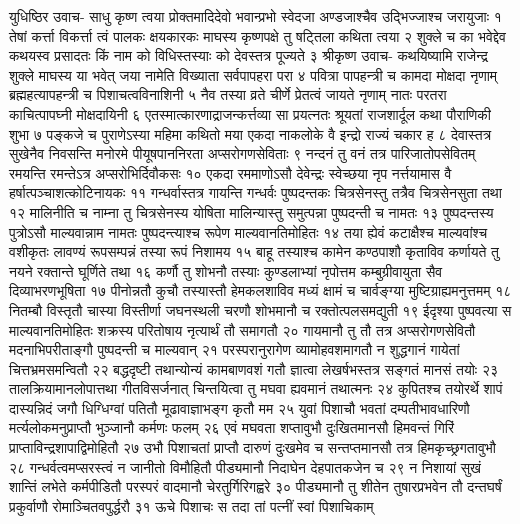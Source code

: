 युधिष्ठिर उवाच-
साधु कृष्ण त्वया प्रोक्तमादिदेवो भवान्प्रभो 
स्वेदजा अण्डजाश्चैव उद्भिज्जाश्च जरायुजाः १
तेषां कर्त्ता विकर्त्ता त्वं पालकः क्षयकारकः 
माघस्य कृष्णपक्षे तु षट्तिला कथिता त्वया २
शुक्ले च का भवेद्देव कथयस्व प्रसादतः 
किं नाम को विधिस्तस्याः को देवस्तत्र पूज्यते ३
श्रीकृष्ण उवाच-
कथयिष्यामि राजेन्द्र शुक्ले माघस्य या भवेत् 
जया नामेति विख्याता सर्वपापहरा परा ४
पवित्रा पापहन्त्री च कामदा मोक्षदा नृणाम् 
ब्रह्महत्यापहन्त्री च पिशाचत्वविनाशिनी ५
नैव तस्या व्रते चीर्णे प्रेतत्वं जायते नृणाम् 
नातः परतरा काचित्पापघ्नी मोक्षदायिनी ६
एतस्मात्कारणाद्राजन्कर्त्तव्या सा प्रयत्नतः 
श्रूयतां राजशार्दूल कथा पौराणिकी शुभा ७
पङ्कजे च पुराणेऽस्या महिमा कथितो मया 
एकदा नाकलोके वै इन्द्रो राज्यं चकार ह ८
देवास्तत्र सुखेनैव निवसन्ति मनोरमे 
पीयूषपाननिरता अप्सरोगणसेविताः ९
नन्दनं तु वनं तत्र पारिजातोपसेवितम् 
रमयन्ति रमन्तेऽत्र अप्सरोभिर्दिवौकसः १०
एकदा रममाणोऽसौ देवेन्द्रः स्वेच्छया नृप 
नर्त्तयामास वै हर्षात्पञ्चाशत्कोटिनायकः ११
गन्धर्वास्तत्र गायन्ति गन्धर्वः पुष्पदन्तकः 
चित्रसेनस्तु तत्रैव चित्रसेनसुता तथा १२
मालिनीति च नाम्ना तु चित्रसेनस्य योषिता 
मालिन्यास्तु समुत्पन्ना पुष्पदन्ती च नामतः १३
पुष्पदन्तस्य पुत्रोऽसौ माल्यवान्नाम नामतः 
पुष्पदन्त्याश्च रूपेण माल्यवानतिमोहितः १४
तया ह्येवं कटाक्षैश्च माल्यवांश्च वशीकृतः 
लावण्यं रूपसम्पन्नं तस्या रूपं निशामय १५
बाहू तस्याश्च कामेन कण्ठपाशौ कृताविव 
कर्णायते तु नयने रक्तान्ते घूर्णिते तथा १६
कर्णौ तु शोभनौ तस्याः कुण्डलाभ्यां नृपोत्तम 
कम्बुग्रीवायुता सैव दिव्याभरणभूषिता १७
पीनोन्नतौ कुचौ तस्यास्तौ हेमकलशाविव 
मध्यं क्षामं च चार्वङ्ग्या मुष्टिग्राह्यमनुत्तमम् १८
नितम्बौ विस्तृतौ चास्या विस्तीर्णा जघनस्थली 
चरणौ शोभमानौ च रक्तोत्पलसमद्युती १९
ईदृश्या पुष्पवत्या स माल्यवानतिमोहितः 
शक्रस्य परितोषाय नृत्यार्थं तौ समागतौ २०
गायमानौ तु तौ तत्र अप्सरोगणसेवितौ 
मदनाभिपरीताङ्गौ पुष्पदन्ती च माल्यवान् २१
परस्परानुरागेण व्यामोहवशमागतौ 
न शुद्धगानं गायेतां चित्तभ्रमसमन्वितौ २२
बद्धदृष्टी तथान्योन्यं कामबाणवशं गतौ 
ज्ञात्वा लेखर्षभस्तत्र सङ्गतं मानसं तयोः २३
तालक्रियामानलोपात्तथा गीतविसर्जनात् 
चिन्तयित्वा तु मघवा ह्यवमानं तथात्मनः २४
कुपितश्च तयोरर्थे शापं दास्यन्निदं जगौ 
धिग्धिग्वां पतितौ मूढावाज्ञाभङ्ग कृतौ मम २५
युवां पिशाचौ भवतां दम्पतीभावधारिणौ 
मर्त्यलोकमनुप्राप्तौ भुञ्जानौ कर्मणः फलम् २६
एवं मघवता शप्तावुभौ दुःखितमानसौ 
हिमवन्तं गिरिं प्राप्ताविन्द्रशापाद्विमोहितौ २७
उभौ पिशाचतां प्राप्तौ दारुणं दुःखमेव च 
सन्तप्तमानसौ तत्र हिमकृच्छ्रगतावुभौ २८
गन्धर्वत्वमप्सरस्त्वं न जानीतो विमौहितौ 
पीड्यमानौ निदाघेन देहपातकजेन च २९
न निशायां सुखं शान्तिं लभेते कर्मपीडितौ 
परस्परं वादमानौ चेरतुर्गिरिगह्वरे ३०
पीड्यमानौ तु शीतेन तुषारप्रभवेन तौ 
दन्तघर्षं प्रकुर्वाणौ रोमाञ्चितवपुर्द्धरौ ३१
ऊचे पिशाचः स तदा तां पत्नीं स्वां पिशाचिकाम् 

